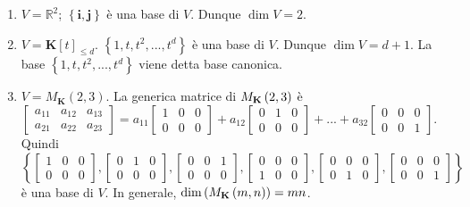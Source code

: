 \documentclass{article}
\begin{document}
\begin{enumerate}
\item $V=%
\mathbb{R}
^{2}$; $\left\{ \mathbf{i,j}\right\} $ \`{e} una base di $V$. Dunque $\dim
V=2$.

\item $V=\mathbf{K}\left[ t\right] _{\leq d}$. $\left\{
1,t,t^{2},...,t^{d}\right\} $ \`{e} una base di $V$. Dunque $\dim V=d+1$. La
base $\left\{ 1,t,t^{2},...,t^{d}\right\} $ viene detta base canonica.

\item $V=M_{\mathbf{K}}\left( 2,3\right) $. La generica matrice di $M_{%
\mathbf{K}}\left( 2,3\right) $ \`{e} $\left[ 
\begin{array}{ccc}
a_{11} & a_{12} & a_{13} \\ 
a_{21} & a_{22} & a_{23}%
\end{array}%
\right] =a_{11}\left[ 
\begin{array}{ccc}
1 & 0 & 0 \\ 
0 & 0 & 0%
\end{array}%
\right] +a_{12}\left[ 
\begin{array}{ccc}
0 & 1 & 0 \\ 
0 & 0 & 0%
\end{array}%
\right] +...+a_{32}\left[ 
\begin{array}{ccc}
0 & 0 & 0 \\ 
0 & 0 & 1%
\end{array}%
\right] $. Quindi $\left\{ \left[ 
\begin{array}{ccc}
1 & 0 & 0 \\ 
0 & 0 & 0%
\end{array}%
\right] ,\left[ 
\begin{array}{ccc}
0 & 1 & 0 \\ 
0 & 0 & 0%
\end{array}%
\right] ,\left[ 
\begin{array}{ccc}
0 & 0 & 1 \\ 
0 & 0 & 0%
\end{array}%
\right] ,\left[ 
\begin{array}{ccc}
0 & 0 & 0 \\ 
1 & 0 & 0%
\end{array}%
\right] ,\left[ 
\begin{array}{ccc}
0 & 0 & 0 \\ 
0 & 1 & 0%
\end{array}%
\right] ,\left[ 
\begin{array}{ccc}
0 & 0 & 0 \\ 
0 & 0 & 1%
\end{array}%
\right] \right\} $ \`{e} una base di $V$. In generale, $\dim \left( M_{%
\mathbf{K}}\left( m,n\right) \right) =mn$.
\end{enumerate}
\end{document}
